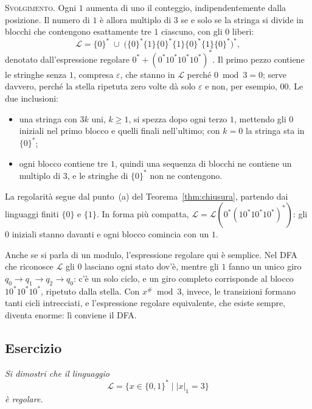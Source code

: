 \documentclass[a4paper, 11pt, oneside]{book}
\makeatletter
\theoremstyle{formale}
\newcommand{\spaziominimo}[1]{%
    \par
    \if@nobreak\else
        \ifdim\pagegoal<\maxdimen
            \ifdim\dimexpr\pagegoal-\pagetotal\relax<#1\relax
                \ifdim\pagetotal>\pagegoal\else
                    \newpage
                \fi
            \fi
        \fi
    \fi}
\newcounter{escount}[section]
\newcommand{\esercizio}{
    \spaziominimo{8\baselineskip}%
    \refstepcounter{escount}%
    \subsection*{Esercizio \arabic{escount}}%
}
\makeatother
\begin{document}
    \textsc{Svolgimento}. Ogni $1$ aumenta di uno il conteggio, indipendentemente dalla
    posizione. Il numero di $1$ \`e allora multiplo di $3$ se e solo se la stringa si
    divide in blocchi che contengono esattamente tre $1$ ciascuno, con gli $0$ liberi:
    \begin{equation*}
        \mathcal{L} = \{0\}^* \;\cup\;
            \bigl(\{0\}^* \{1\} \{0\}^* \{1\} \{0\}^* \{1\} \{0\}^*\bigr)^*,
    \end{equation*}
    denotato dall'espressione regolare $0^* + (0^*10^*10^*10^*)^*$. Il primo pezzo
    contiene le stringhe senza $1$, compresa $\varepsilon$, che stanno in $\mathcal{L}$
    perch\'e $0 \bmod 3 = 0$; serve davvero, perch\'e la stella ripetuta zero volte d\`a
    solo $\varepsilon$ e non, per esempio, $00$. Le due inclusioni:
    \begin{itemize}
        \item[($\subseteq$)] una stringa con $3k$ uni, $k \geq 1$, si spezza dopo ogni
            terzo $1$, mettendo gli $0$ iniziali nel primo blocco e quelli finali
            nell'ultimo; con $k = 0$ la stringa sta in $\{0\}^*$;
        \item[($\supseteq$)] ogni blocco contiene tre $1$, quindi una sequenza di blocchi
            ne contiene un multiplo di $3$, e le stringhe di $\{0\}^*$ non ne contengono.
    \end{itemize}
    La regolarit\`a segue dal punto~(a) del Teorema~\ref{thm:chiusura}, partendo dai
    linguaggi finiti $\{0\}$ e $\{1\}$. In forma pi\`u compatta,
    $\mathcal{L} = \mathcal{L}(0^*(10^*10^*10^*)^*)$: gli $0$ iniziali stanno davanti e
    ogni blocco comincia con un $1$.

    Anche se si parla di un modulo, l'espressione regolare qui \`e semplice. Nel DFA che
    riconosce $\mathcal{L}$ gli $0$ lasciano ogni stato dov'\`e, mentre gli $1$ fanno un
    unico giro $q_0 \to q_1 \to q_2 \to q_0$: c'\`e un solo ciclo, e un giro completo
    corrisponde al blocco $10^*10^*10^*$, ripetuto dalla stella. Con $x^\# \bmod 3$,
    invece, le transizioni formano tanti cicli intrecciati, e l'espressione regolare
    equivalente, che esiste sempre, diventa enorme: l\`i conviene il DFA.

    \esercizio
    \textit{Si dimostri che il linguaggio
    \begin{equation*}
        \mathcal{L} = \{x \in \{0, 1\}^* \mid |x|_1 = 3\}
    \end{equation*}
    \`e regolare.}
\end{document}
